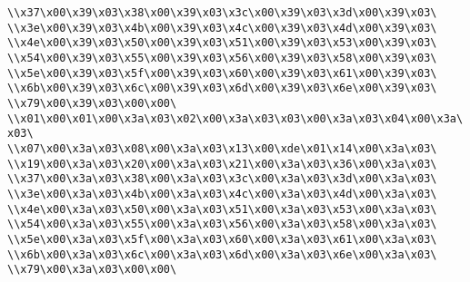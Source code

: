 \verb|\\x37\x00\x39\x03\x38\x00\x39\x03\x3c\x00\x39\x03\x3d\x00\x39\x03\|\newline
\verb|\\x3e\x00\x39\x03\x4b\x00\x39\x03\x4c\x00\x39\x03\x4d\x00\x39\x03\|\newline
\verb|\\x4e\x00\x39\x03\x50\x00\x39\x03\x51\x00\x39\x03\x53\x00\x39\x03\|\newline
\verb|\\x54\x00\x39\x03\x55\x00\x39\x03\x56\x00\x39\x03\x58\x00\x39\x03\|\newline
\verb|\\x5e\x00\x39\x03\x5f\x00\x39\x03\x60\x00\x39\x03\x61\x00\x39\x03\|\newline
\verb|\\x6b\x00\x39\x03\x6c\x00\x39\x03\x6d\x00\x39\x03\x6e\x00\x39\x03\|\newline
\verb|\\x79\x00\x39\x03\x00\x00\|\newline
\verb|\\x01\x00\x01\x00\x3a\x03\x02\x00\x3a\x03\x03\x00\x3a\x03\x04\x00\x3a\x03\|\newline
\verb|\\x07\x00\x3a\x03\x08\x00\x3a\x03\x13\x00\xde\x01\x14\x00\x3a\x03\|\newline
\verb|\\x19\x00\x3a\x03\x20\x00\x3a\x03\x21\x00\x3a\x03\x36\x00\x3a\x03\|\newline
\verb|\\x37\x00\x3a\x03\x38\x00\x3a\x03\x3c\x00\x3a\x03\x3d\x00\x3a\x03\|\newline
\verb|\\x3e\x00\x3a\x03\x4b\x00\x3a\x03\x4c\x00\x3a\x03\x4d\x00\x3a\x03\|\newline
\verb|\\x4e\x00\x3a\x03\x50\x00\x3a\x03\x51\x00\x3a\x03\x53\x00\x3a\x03\|\newline
\verb|\\x54\x00\x3a\x03\x55\x00\x3a\x03\x56\x00\x3a\x03\x58\x00\x3a\x03\|\newline
\verb|\\x5e\x00\x3a\x03\x5f\x00\x3a\x03\x60\x00\x3a\x03\x61\x00\x3a\x03\|\newline
\verb|\\x6b\x00\x3a\x03\x6c\x00\x3a\x03\x6d\x00\x3a\x03\x6e\x00\x3a\x03\|\newline
\verb|\\x79\x00\x3a\x03\x00\x00\|\newline
